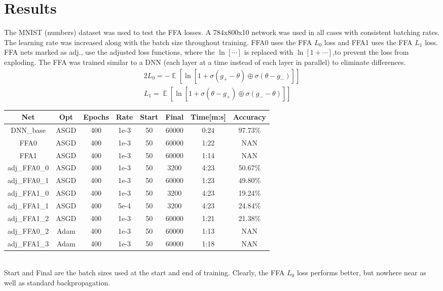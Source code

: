\documentclass[12pt]{iopart}
\theoremstyle{break}
\DeclareMathOperator{\E}{\mathbb{E}}
\begin{document}
\section{Results}
The MNIST (numbers) dataset \cite{MNIST} was used to test the FFA losses.
A 784x800x10 network was used in all cases with consistent batching rates.
The learning rate was increased along with the batch size throughout training.
FFA0 uses the FFA $L_0$ loss and FFA1 uses the FFA $L_1$ loss.
FFA nets marked as adj., use the adjusted loss functions, where the $\ln[\cdots]$ is replaced with $\ln[1 + \cdots]$,to prevent the loss from exploding.
The FFA was trained similar to a DNN (each layer at a time instead of each layer in parallel) to eliminate differences.
\begin{alignat}{2}
L_0 = -\E[\ln[1 + \sigma(g_+-\theta)\oplus\sigma(\theta-g_-)]] \\
L_1 = \E[\ln[1 + \sigma(\theta-g_+)\oplus\sigma(g_--\theta)]]
\end{alignat}
\begin{tabular}{ c|c c c c c|c c}
Net & Opt & Epochs & Rate & Start & Final & Time[m:s] & Accuracy \\
\hline
DNN\_base   & ASGD & 400 & 1e-3 & 50 & 60000 & 0:24 & 97.73\% \\
FFA0       & ASGD & 400 & 1e-3 & 50 & 60000 & 1:22 & NAN \\
FFA1       & ASGD & 400 & 1e-3 & 50 & 60000 & 1:14 & NAN \\
adj\_FFA0\_0 & ASGD & 400 & 1e-3 & 50 & 3200 & 4:23 & 50.67\% \\
adj\_FFA0\_1 & ASGD & 400 & 1e-3 & 50 & 60000 & 1:23 & 49.80\% \\
adj\_FFA1\_0 & ASGD & 400 & 1e-3 & 50 & 3200 & 4:23 & 19.24\% \\
adj\_FFA1\_1 & ASGD & 400 & 5e-4 & 50 & 3200 & 4:23 & 24.84\% \\
adj\_FFA1\_2 & ASGD & 400 & 1e-3 & 50 & 60000 & 1:21 & 21.38\% \\
adj\_FFA0\_2 & Adam & 400 & 1e-3 & 50 & 60000 & 1:13 & NAN \\
adj\_FFA1\_3 & Adam & 400 & 1e-3 & 50 & 60000 & 1:18 & NAN \\
\end{tabular} \\
	
	
	
Start and Final are the batch sizes used at the start and end of training.
Clearly, the FFA $L_0$ loss performs better, but nowhere near as well as standard backpropagation.\\
	
\end{document}
